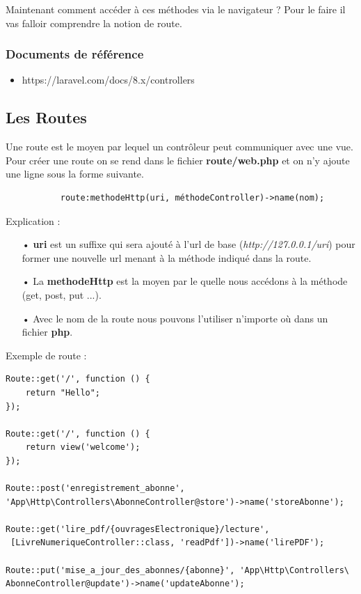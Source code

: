 \documentclass[12pt,a4paper]{article}
\begin{document}
Maintenant comment accéder à ces méthodes via le navigateur ? Pour le faire il vas falloir comprendre la notion de route.\\

\subsubsection{Documents de référence}

\begin{itemize}
\item https://laravel.com/docs/8.x/controllers\\
\end{itemize}

\subsection{Les Routes}
Une route est le moyen par lequel un contrôleur peut communiquer avec une vue.\\
Pour créer une route on se rend dans le fichier \textbf{route/web.php} et on n'y ajoute une ligne sous la forme suivante.\\

\begin{verbatim}
           route:methodeHttp(uri, méthodeController)->name(nom);
\end{verbatim}



Explication :
\begin{itemize}
\item[•] \textbf{uri} est un suffixe qui sera ajouté à l'url de base (\textit{http://127.0.0.1/uri}) pour former une nouvelle url menant à la méthode indiqué dans la route.\\

\item[•] La \textbf{methodeHttp} est la moyen par le quelle nous accédons à la méthode (get, post, put ...).\\

\item[•] Avec le nom de la route nous pouvons l'utiliser n'importe où dans un fichier \textbf{php}.\\ 
\end{itemize}

Exemple de route :\\
 
\begin{verbatim}
Route::get('/', function () {
    return "Hello";
});

Route::get('/', function () {
    return view('welcome');
});

Route::post('enregistrement_abonne', 
'App\Http\Controllers\AbonneController@store')->name('storeAbonne');

Route::get('lire_pdf/{ouvragesElectronique}/lecture',
 [LivreNumeriqueController::class, 'readPdf'])->name('lirePDF');

Route::put('mise_a_jour_des_abonnes/{abonne}', 'App\Http\Controllers\
AbonneController@update')->name('updateAbonne');
 
\end{verbatim}
\end{document}
